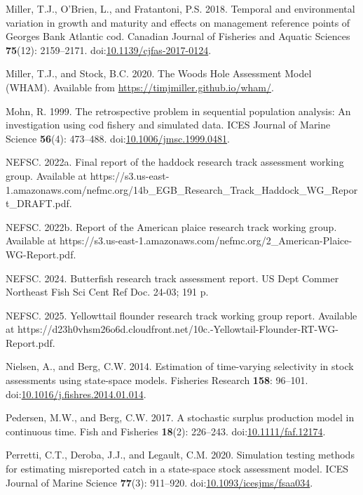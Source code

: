 \documentclass[
  12pt,
]{article}
\newlength{\cslhangindent}
\newenvironment{CSLReferences}[2] %
 {\begin{list}{}{%
  \setlength{\itemindent}{0pt}
  \setlength{\leftmargin}{0pt}
  \setlength{\parsep}{0pt}
  \ifodd #1
   \setlength{\leftmargin}{\cslhangindent}
   \setlength{\itemindent}{-1\cslhangindent}
  \fi
  \setlength{\itemsep}{#2\baselineskip}}}
 {\end{list}}
\begin{document}
\begin{CSLReferences}{1}{0}
Miller, T.J., O'Brien, L., and Fratantoni, P.S. 2018. Temporal and
environmental variation in growth and maturity and effects on management
reference points of {G}eorges {B}ank {A}tlantic cod. Canadian Journal of
Fisheries and Aquatic Sciences \textbf{75}(12): 2159--2171.
doi:\href{https://doi.org/10.1139/cjfas-2017-0124}{10.1139/cjfas-2017-0124}.

Miller, T.J., and Stock, B.C. 2020. The {Woods Hole Assessment Model}
({WHAM}). Available from \url{https://timjmiller.github.io/wham/}.

Mohn, R. 1999. The retrospective problem in sequential population
analysis: An investigation using cod fishery and simulated data. ICES
Journal of Marine Science \textbf{56}(4): 473--488.
doi:\href{https://doi.org/10.1006/jmsc.1999.0481}{10.1006/jmsc.1999.0481}.

NEFSC. 2022a. Final report of the haddock research track assessment
working group. {Available} at
https://s3.us-east-1.amazonaws.com/nefmc.org/14b\_EGB\_Research\_Track\_Haddock\_WG\_Report\_DRAFT.pdf.

NEFSC. 2022b. Report of the {A}merican plaice research track working
group. {Available} at
https://s3.us-east-1.amazonaws.com/nefmc.org/2\_American-Plaice-WG-Report.pdf.

NEFSC. 2024. Butterfish research track assessment report. US Dept Commer
Northeast Fish Sci Cent Ref Doc. 24-03; 191 p.

NEFSC. 2025. Yellowttail flounder research track working group report.
{Available} at
https://d23h0vhsm26o6d.cloudfront.net/10c.-Yellowtail-Flounder-RT-WG-Report.pdf.

Nielsen, A., and Berg, C.W. 2014. Estimation of time-varying selectivity
in stock assessments using state-space models. Fisheries Research
\textbf{158}: 96--101.
doi:\href{https://doi.org/10.1016/j.fishres.2014.01.014}{10.1016/j.fishres.2014.01.014}.

Pedersen, M.W., and Berg, C.W. 2017. A stochastic surplus production
model in continuous time. Fish and Fisheries \textbf{18}(2): 226--243.
doi:\href{https://doi.org/10.1111/faf.12174}{10.1111/faf.12174}.

Perretti, C.T., Deroba, J.J., and Legault, C.M. 2020. Simulation testing
methods for estimating misreported catch in a state-space stock
assessment model. ICES Journal of Marine Science \textbf{77}(3):
911--920.
doi:\href{https://doi.org/10.1093/icesjms/fsaa034}{10.1093/icesjms/fsaa034}.


\end{CSLReferences}
\end{document}
